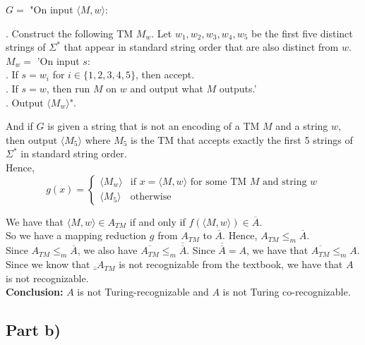\documentclass[12pt]{article}
\begin{document}
$G = $ "On input $\langle M, w \rangle$: \\

\setlength\parindent{15pt}

. Construct the following TM $M_w$. Let $w_1,w_2,w_3,w_4,w_5$ be the first five distinct strings of $\Sigma^*$ that appear in standard string order that are also distinct from $w$. \\
\indent \indent $M_w = $ 'On input $s$: \\
\indent \indent {}. If $s = w_i$ for $i \in \{1,2,3,4,5\}$, then accept. \\
\indent \indent {}. If $s = w$, then run $M$ on $w$ and output what $M$ outputs.' \\

. Output $\langle M_w \rangle$". \\

\setlength\parindent{0pt}

And if $G$ is given a string that is not an encoding of a TM $M$ and a string $w$, then output $\langle M_5 \rangle$ where $M_5$ is the TM that accepts exactly the first 5 strings of $\Sigma^*$ in standard string order. \\

Hence, 
\[
  g(x) =
  \begin{cases}
        \langle M_w \rangle & \text{if $x = \langle M, w \rangle$ for some TM $M$ and string $w$} \\
        \langle M_5 \rangle & \text{otherwise} 
  \end{cases}
\]

We have that $\langle M, w \rangle \in A_{TM}$ if and only if $f(\langle M, w \rangle) \in \overline{A}$. \\

So we have a mapping reduction $g$ from $A_{TM}$ to $\overline{A}$. Hence, $A_{TM} \leq_m \overline{A}$. \\

Since $A_{TM} \leq_m \overline{A}$, we also have $\overline{A_{TM}} \leq_m \overline{\overline{A}}$. Since $\overline{\overline{A}} = A$, we have that $\overline{A_{TM}} \leq_m A$. Since we know that $\overline_{A_{TM}}$ is not recognizable from the textbook, we have that $A$ is not recognizable. \\

\textbf{Conclusion:} $A$ is not Turing-recognizable and $A$ is not Turing co-recognizable. 

\subsection*{Part b)}
\end{document}
